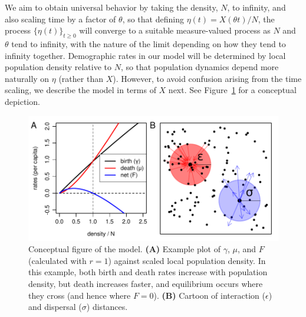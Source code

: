 \documentclass[12pt]{article}
\begin{document}
We aim to obtain universal behavior by taking the density, $N$, to infinity,
and also scaling time by a factor of $\theta$,
so that defining $\eta(t) = X(\theta t) / N$,
the process $\{\eta(t)\}_{t \ge 0}$
will converge to a suitable measure-valued process
as $N$ and $\theta$ tend to infinity,
with the nature of the limit depending on how they tend to infinity together.
Demographic rates in our model
will be determined by local population density relative to $N$,
so that population dynamics depend more naturally on $\eta$ (rather than $X$).
However, to avoid confusion arising from the time scaling,
we describe the model in terms of $X$ next.
See Figure~\ref{fig:model_setup} for a conceptual depiction.

\begin{figure}
    \begin{center}
        \includegraphics{figures/conceptual_figure}
    \end{center}
    \caption{
        Conceptual figure of the model.
        \textbf{(A)} Example plot of $\gamma$, $\mu$, and $F$
        (calculated with $r=1$) against scaled local population density.
        In this example, both birth and death rates increase with population density,
        but death increases faster,
        and equilibrium occurs where they cross
        (and hence where $F=0$).
        \textbf{(B)} Cartoon of interaction ($\epsilon$) and dispersal ($\sigma$) distances.
        \label{fig:model_setup}
    }
\end{figure}
\end{document}
